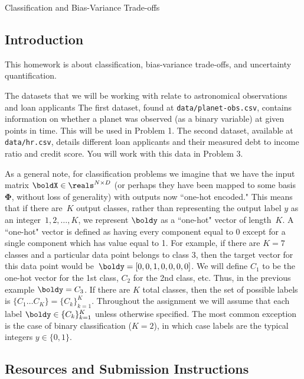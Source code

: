 \documentclass[submit]{harvardml}
\begin{document}
\begin{center}
  {\Large Classification and Bias-Variance Trade-offs}\\
\end{center}

\subsection*{Introduction}

This homework is about classification, bias-variance trade-offs, and
uncertainty quantification.

The datasets that we will be working with relate to astronomical observations and loan applicants
The first dataset, found at \verb|data/planet-obs.csv|,
contains information on whether a planet was observed (as a binary
variable) at given points in time. This will be used in Problem 1. The
second dataset, available at \verb|data/hr.csv|, details different
loan applicants and their measured debt to income ratio and credit score. You will
work with this data in Problem 3.

As a general note, for classification problems we imagine that we have
the input matrix $\boldX \in \reals^{N \times D}$ (or perhaps they
have been mapped to some basis $\bm{\Phi}$, without loss of
generality) with outputs now ``one-hot encoded."  This means that if
there are~$K$ output classes, rather than representing the output
label $y$ as an integer~${1,2,\ldots,K}$, we represent $\boldy$ as a
``one-hot" vector of length~$K$. A ``one-hot" vector is defined as
having every component equal to 0 except for a single component which
has value equal to 1.  For example, if there are $K = 7$ classes and a
particular data point belongs to class 3, then the target vector for
this data point would be~$\boldy = [0,0,1,0,0,0,0]$.  We will define
$C_1$ to be the one-hot vector for the 1st class, $C_2$ for the 2nd
class, etc.  Thus, in the previous example $\boldy = C_3$. If there
are $K$ total classes, then the set of possible labels is $\{C_1
  \ldots C_K \} = \{C_k\}_{k=1}^K$.  Throughout the assignment we will
assume that each label $\boldy \in \{C_k\}_{k=1}^K$ unless otherwise
specified. The most common exception is the case of binary
classification ($K = 2$), in which case labels are the typical
integers $y \in \{0, 1\}$.

\subsection*{Resources and Submission Instructions}
\end{document}
